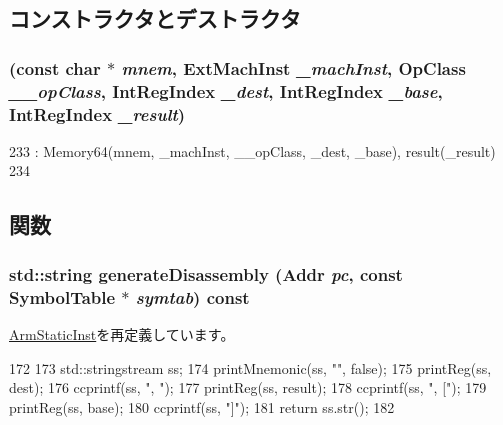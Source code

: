 \subsection{コンストラクタとデストラクタ}
\hypertarget{classArmISA_1_1MemoryEx64_aeda6f17c52c2b0d39707af4284adaaa3}{
\subsubsection[{MemoryEx64}]{ (const char $\ast$ {\em mnem}, \/  {\bf ExtMachInst} {\em \_\-machInst}, \/  OpClass {\em \_\-\_\-opClass}, \/  {\bf IntRegIndex} {\em \_\-dest}, \/  {\bf IntRegIndex} {\em \_\-base}, \/  {\bf IntRegIndex} {\em \_\-result})}}
\label{classArmISA_1_1MemoryEx64_aeda6f17c52c2b0d39707af4284adaaa3}



\begin{DoxyCode}
233         : Memory64(mnem, _machInst, __opClass, _dest, _base), result(_result)
234     {}
\end{DoxyCode}


\subsection{関数}
\hypertarget{classArmISA_1_1MemoryEx64_a95d323a22a5f07e14d6b4c9385a91896}{
\subsubsection[{generateDisassembly}]{\setlength{\rightskip}{0pt plus 5cm}std::string generateDisassembly ({\bf Addr} {\em pc}, \/  const SymbolTable $\ast$ {\em symtab}) const}}
\label{classArmISA_1_1MemoryEx64_a95d323a22a5f07e14d6b4c9385a91896}


\hyperlink{classArmISA_1_1ArmStaticInst_a95d323a22a5f07e14d6b4c9385a91896}{ArmStaticInst}を再定義しています。


\begin{DoxyCode}
172 {
173     std::stringstream ss;
174     printMnemonic(ss, "", false);
175     printReg(ss, dest);
176     ccprintf(ss, ", ");
177     printReg(ss, result);
178     ccprintf(ss, ", [");
179     printReg(ss, base);
180     ccprintf(ss, "]");
181     return ss.str();
182 }
\end{DoxyCode}


